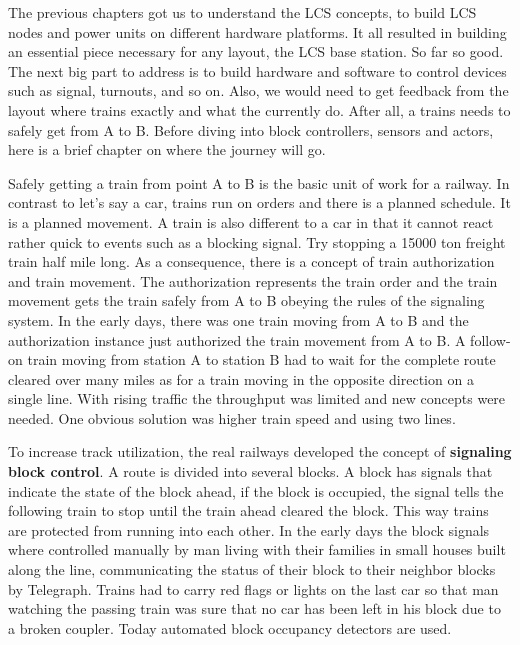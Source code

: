 
The previous chapters got us to understand the LCS concepts, to build LCS nodes and power units on different hardware platforms. It all resulted in building an essential piece necessary for any layout, the LCS base station. So far so good. The next big part to address is to build hardware and software to control devices such as signal, turnouts, and so on. Also, we would need to get feedback from the layout where trains exactly and what the currently do. After all, a trains needs to safely get from A to B. Before diving into block controllers, sensors and actors, here is a brief chapter on where the journey will go.

Safely getting a train from point A to B is the basic unit of work for a railway. In contrast to let's say a car, trains run on orders and there is a planned schedule. It is a planned movement. A train is also different to a car in that it cannot react rather quick to events such as a blocking signal. Try stopping a 15000 ton freight train half mile long. As a consequence, there is a concept of train authorization and train movement. The authorization represents the train order and the train movement gets the train safely from A to B obeying the rules of the signaling system. In the early days, there was one train moving from A to B and the authorization instance just authorized the train movement from A to B. A follow-on train moving from station A to station B had to wait for the complete route cleared over many miles as for a train moving in the opposite direction on a single line. With rising traffic the throughput was limited and new concepts were needed. One obvious solution was higher train speed and using two lines.

To increase track utilization, the real railways developed the concept of \textbf{signaling block control}. A route is divided into several blocks. A block has signals that indicate the state of the block ahead, if the block is occupied, the signal tells the following train to stop until the train ahead cleared the block. This way trains are protected from running into each other. In the early days the block signals where controlled manually by man living with their families in small houses built along the line, communicating the status of their block to their neighbor blocks by Telegraph. Trains had to carry red flags or lights on the last car so that man watching the passing train was sure that no car has been left in his block due to a broken coupler. Today automated block occupancy detectors are used.

